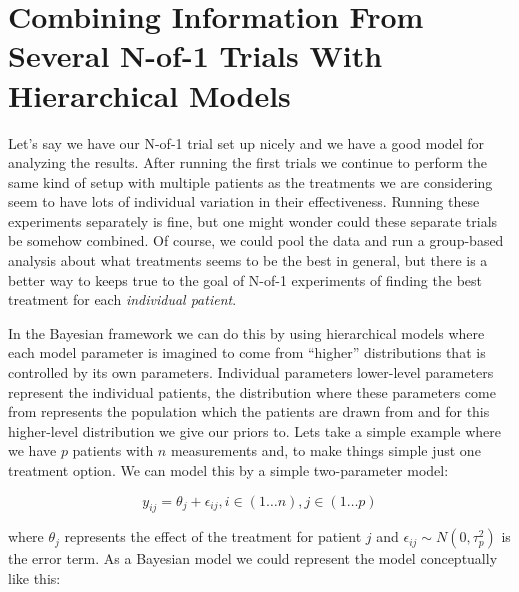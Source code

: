 \documentclass[12pt,a4paper,leqno]{report}
\theoremstyle{plain}
\theoremstyle{definition}
\theoremstyle{remark}
\begin{document}
\chapter{Combining Information From Several N-of-1 Trials With Hierarchical
  Models}\label{hierarchicalbayes}

Let's say we have our N-of-1 trial set up nicely and we have a good model for analyzing the
results. After running the first trials we continue to perform the same kind of setup
with multiple patients as the treatments we are considering seem to have lots of
individual variation in their effectiveness. Running these experiments separately is
fine, but one might wonder could these separate trials be somehow combined. Of course, we could pool the data and run a group-based
analysis about what treatments seems to be the best in general, but there is a better
way to keeps true to the goal of N-of-1 experiments of finding the best treatment for
each \emph{individual patient}.

In the Bayesian framework we can do this by using hierarchical
models where each model parameter is imagined to come from ``higher'' distributions
that is controlled by its own parameters. Individual parameters lower-level parameters represent the
individual patients, the distribution where these parameters come from represents
the population which the patients are drawn from and for this higher-level distribution
we give our priors to. Lets take a simple example where we have $p$ patients with $n$
measurements and, to make things simple just one treatment option. We can model this by
a simple two-parameter model:

\begin{def}\label{}
    \begin{equation}\label{simplehierachical}
        y_{ij} = \theta_j + \epsilon_{ij}, i\in(1 \dots n), j\in(1 \dots p)
    \end{equation}
\end{def}where $\theta_j$ represents the effect of the treatment for patient $j$ and
\(\epsilon_{ij} \sim N(0,\tau_p^2)\) is the error term. As a Bayesian model we could
represent the model conceptually like this:


\bigskip
\end{document}
